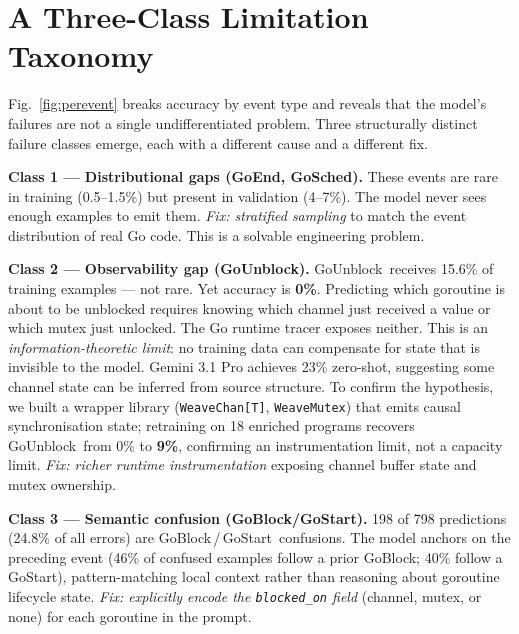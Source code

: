 \documentclass[10pt,conference]{IEEEtran}
\newcommand{\pblock}{\textsf{GoBlock}}
\newcommand{\punblock}{\textsf{GoUnblock}}
\newcommand{\pstart}{\textsf{GoStart}}
\newcommand{\pend}{\textsf{GoEnd}}
\newcommand{\psched}{\textsf{GoSched}}
\begin{document}
\section{A Three-Class Limitation Taxonomy}\label{sec:limits}

Fig.~\ref{fig:perevent} breaks accuracy by event type and reveals that
the model's failures are not a single undifferentiated problem.
Three structurally distinct failure classes emerge, each with a
different cause and a different fix.

\noindent\textbf{Class 1 — Distributional gaps (\pend, \psched).}
These events are rare in training (0.5--1.5\%) but present in
validation (4--7\%).
The model never sees enough examples to emit them.
\textit{Fix: stratified sampling} to match the event distribution of
real Go code. This is a solvable engineering problem.

\smallskip
\noindent\textbf{Class 2 — Observability gap (\punblock).}
\punblock\ receives 15.6\% of training examples — not rare.
Yet accuracy is \textbf{0\%}.
Predicting which goroutine is about to be unblocked requires knowing
which channel just received a value or which mutex just unlocked.
The Go runtime tracer exposes neither.
This is an \textit{information-theoretic limit}: no training data can
compensate for state that is invisible to the model.
Gemini 3.1 Pro achieves 23\% zero-shot, suggesting some channel state
can be inferred from source structure.
To confirm the hypothesis, we built a wrapper library
(\texttt{WeaveChan[T]}, \texttt{WeaveMutex}) that emits causal
synchronisation state; retraining on 18 enriched programs recovers
\punblock\ from 0\% to \textbf{9\%}, confirming an instrumentation
limit, not a capacity limit.
\textit{Fix: richer runtime instrumentation} exposing channel buffer
state and mutex ownership.

\smallskip
\noindent\textbf{Class 3 — Semantic confusion (\pblock/\pstart).}
198 of 798 predictions (24.8\% of all errors) are
\pblock\,/\,\pstart\ confusions.
The model anchors on the preceding event (46\% of confused examples
follow a prior \pblock; 40\% follow a \pstart), pattern-matching local
context rather than reasoning about goroutine lifecycle state.
\textit{Fix: explicitly encode the \texttt{blocked\_on} field} (channel,
mutex, or none) for each goroutine in the prompt.
\end{document}
